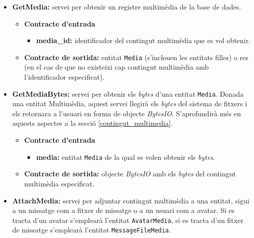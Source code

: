 		\begin{itemize}

			\item \textbf{GetMedia:} servei per obtenir un registre multimèdia de la base de dades.
				\begin{itemize}
					\item \textbf{Contracte d'entrada}
						\begin{itemize}
							\item \textbf{media\_id:} identificador del contingut multimèdia que es vol obtenir.
						\end{itemize}
					\item \textbf{Contracte de sortida:} entitat \texttt{Media} (s'inclouen les entitats filles) o res (en el cas de que no existeixi cap contingut multimèdia amb l'identificador especificat).
				\end{itemize}
				
			\item \textbf{GetMediaBytes:} servei per obtenir els \emph{bytes} d'una entitat \texttt{Media}. Donada una entitat Multimèdia, aquest servei llegirà els \emph{bytes} del sistema de fitxers i els retornara a l'usuari en forma de objecte \emph{BytesIO}. S'aprofundirà més en aquests aspectes a la secció \ref{contingut_multimedia}.
			
				\begin{itemize}
					\item \textbf{Contracte d'entrada}
						\begin{itemize}
							\item \textbf{media:} entitat \texttt{Media} de la qual es volen obtenir els \emph{bytes}.
						\end{itemize}
					\item \textbf{Contracte de sortida:}  objecte \emph{BytesIO} amb els \emph{bytes} del contingut multimèdia especificat.
				\end{itemize}
				
			\item \textbf{AttachMedia:} servei per adjuntar contingut multimèdia a una entitat, sigui a un missatge com a fitxer de missatge o a un usuari com a avatar. Si es tracta d'un avatar s'emplearà l'entitat \texttt{AvatarMedia}, si es tracta d'un fitxer de missatge s'emplearà l'entitat \texttt{MessageFileMedia}.
			

\end{itemize}
